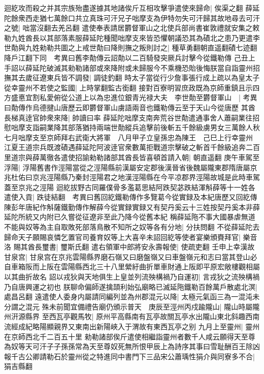 迴紇攻而殺之并其宗族殆盡遂據其地諸俟斤互相攻擊爭遣使來歸命|{
	俟渠之翻}
薛延陀餘衆西走猶七萬餘口共立真珠可汗兄子咄摩支為伊特勿失可汗歸其故地尋去可汗之號|{
	咄當沒翻去羌呂翻}
遣使奉表請居欝督軍山之北使兵部尚書崔敦禮就安集之敕勒九姓酋長以其部落素服薛延陀種聞咄摩支來皆恐懼朝議恐其為磧北之患乃更遣李世勣與九姓勑勒共圖之上戒世勣曰降則撫之叛則討之|{
	種草勇翻朝直遥翻磧七迹翻降戶江翻下同　考異曰舊李勣傳云詔勣以二百騎發突厥兵討擊今從鐵勒傳}
己丑上手詔以薛延陀破滅其勑勒諸部或來降附或未歸服今不乘機恐貽後悔朕當自詣靈州招撫其去歲征遼東兵皆不調發|{
	調徒釣翻}
時太子當從行少詹事張行成上疏以為皇太子從幸靈州不若使之監國|{
	上時掌翻監古銜翻}
接對百寮明習庶政既為京師重鎮且示四方盛悳宜割私愛俯從公道上以為忠進位銀青光禄大夫　李世勣至欝督軍山　|{
	考異曰勣傳作烏德揵山唐歷云即欝督軍山虜語兩音也鐵勒傳云至于天山今從唐歷}
其酋長梯真逹官帥衆來降|{
	帥讀曰率}
薛延陀咄摩支南奔荒谷世勣遣通事舍人蕭嗣業往招慰咄摩支詣嗣業降其部落猶持兩端世勣縱兵追擊前後斬五千餘級虜男女三萬餘人秋七月咄摩支至京師拜右武衛大將軍　八月甲子立皇孫忠為陳王　己巳上行幸靈州　江夏王道宗兵既渡磧遇薛延陀阿波逹官衆數萬拒戰道宗擊破之斬首千餘級追奔二百里道宗與薛萬徹各遣使招諭勑勒諸部其酋長皆喜頓首請入朝|{
	朝直遥翻}
庚午車駕至浮陽|{
	浮陽舊書作涇陽當從之涇陽縣前漢屬安定郡後漢晉省後魏屬隴東郡隋唐屬京兆杜佑曰京兆涇陽縣乃秦封涇陽君之地漢涇陽縣在今平凉郡界涇陽故城是此時車駕蓋至京兆之涇陽}
迴紇拔野古同羅僕骨多濫葛思結阿跌契苾跌結渾斛薛等十一姓各遣使入貢|{
	跌徒結翻　考異曰舊回紇鐵勒傳作多覽葛今從實録及本紀唐歷又回紇傳陳彭年唐紀作斛薩鐵勤傳作解薛今從實録實録又有契丹奚云十三姓按契丹奚本非薛延陀所統又内附已久嘗從征遼非至此乃降今從舊本紀}
稱薛延陁不事大國暴虐無道不能與奴等為主自取敗死部落鳥散不知所之奴等各有分地|{
	分扶問翻}
不從薛延陀去歸命天子願賜哀憐乞置官司養育奴等上大喜辛未詔回紇等使者宴樂頒賚拜官|{
	樂音洛}
賜其酋長璽書|{
	璽斯氏翻}
遣右領軍中郎將安永壽報使|{
	使疏吏翻}
壬申上幸漢故甘泉宫|{
	甘泉宫在京兆雲陽縣界磨石嶺又曰磨盤嶺又曰車盤嶺元和志曰當其登山必自車箱阪而上阪在雲陽縣西北三十八里縈紆曲折單車財通上阪即平原宏敞樓觀相屬以其曲折故名}
詔以戎狄與天地俱生上皇並列流殃構禍乃自運初|{
	言戎狄之流殃構禍乃自唐興運之初也}
朕聊命偏師遂擒頡利始弘廟略已滅延陁鐵勒百餘萬戶散處北溟|{
	處昌呂翻}
遠遣使人委身内屬請同編列並為州郡混元以降|{
	太極元氣函三為一混沌未分謂之混元}
殊未前聞宜備禮告廟仍頒示普天　庚辰至涇州丙戍踰隴山|{
	隴山時屬隴州汧源縣界}
至西瓦亭觀馬牧|{
	原州平高縣南有瓦亭故關瓦亭水出隴山東北斜趣西南流經成紀略陽顯親界又東南出新陽峽入于渭故有東西瓦亭之别}
九月上至靈州|{
	靈州在京師西北千二百五十里}
勑勒諸部俟斤遣使相繼詣靈州者數千人咸云願得天至尊為奴等天可汗子子孫孫常為天至尊奴死無所恨甲辰上為詩序其事曰雪耻酬百王除凶報千古公卿請勒石於靈州從之特進同中書門下三品宋公蕭瑀性狷介與同寮多不合|{
	狷吉縣翻}
